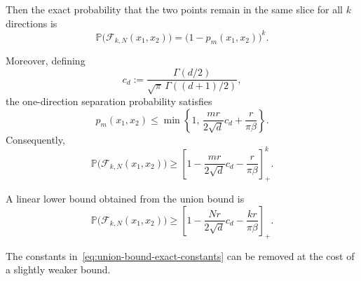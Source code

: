 \begin{theorem}
Then the exact probability that the two points remain in the same
slice for all $k$ directions is
\begin{equation}
    \boxed{
    \mathbb{P}\bigl(\mathcal{F}_{k,N}(x_1,x_2)\bigr)
    =
    \bigl(1-p_m(x_1,x_2)\bigr)^k.
    }
    \label{eq:exact-multiple-direction-probability}
\end{equation}

Moreover, defining
\begin{equation}
    c_d
    :=
    \frac{\Gamma(d/2)}
         {\sqrt{\pi}\,\Gamma((d+1)/2)},
    \label{eq:cd-definition}
\end{equation}
the one-direction separation probability satisfies
\begin{equation}
    p_m(x_1,x_2)
    \leq
    \min
    \left\{
        1,\,
        \frac{m r}{2\sqrt{d}}c_d
        +
        \frac{r}{\pi\beta}
    \right\}.
    \label{eq:one-direction-bound}
\end{equation}
Consequently,
\begin{equation}
    \boxed{
    \mathbb{P}\bigl(\mathcal{F}_{k,N}(x_1,x_2)\bigr)
    \geq
    \left[
        1-
        \frac{mr}{2\sqrt{d}}c_d
        -
        \frac{r}{\pi\beta}
    \right]_+^k.
    }
    \label{eq:product-lower-bound}
\end{equation}

A linear lower bound obtained from the union bound is
\begin{equation}
    \boxed{
    \mathbb{P}\bigl(\mathcal{F}_{k,N}(x_1,x_2)\bigr)
    \geq
    \left[
        1-
        \frac{N r}{2\sqrt{d}}c_d
        -
        \frac{kr}{\pi\beta}
    \right]_+.
    }
    \label{eq:union-bound-exact-constants}
\end{equation}
\end{theorem}

The constants in~\eqref{eq:union-bound-exact-constants} can be removed
at the cost of a slightly weaker bound.

